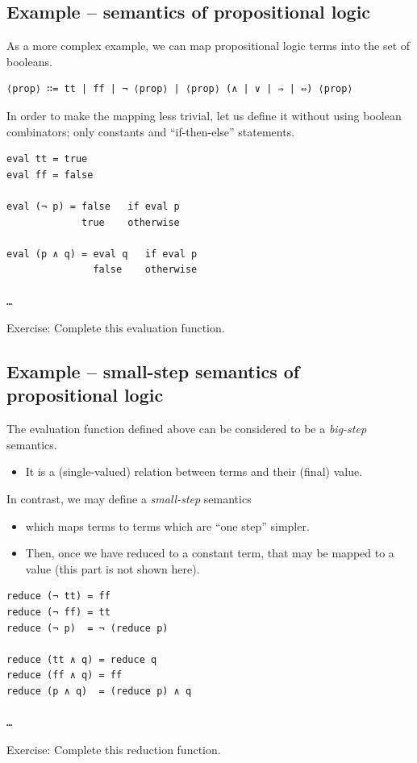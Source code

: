 \documentclass[11pt]{article}
\theoremstyle{definition}
\begin{document}
\subsection{Example – semantics of propositional logic}
\label{sec:orgd3c8abf}
As a more complex example, we can map propositional logic terms
into the set of booleans.
\begin{verbatim}
⟨prop⟩ ∷= tt | ff | ¬ ⟨prop⟩ | ⟨prop⟩ (∧ | ∨ | ⇒ | ⇔) ⟨prop⟩
\end{verbatim}

In order to make the mapping less trivial, let us define it
without using boolean combinators; only constants
and “if-then-else” statements.
\begin{verbatim}
eval tt = true
eval ff = false

eval (¬ p) = false   if eval p
             true    otherwise

eval (p ∧ q) = eval q   if eval p
               false    otherwise

…
\end{verbatim}
Exercise: Complete this evaluation function.

\subsection{Example – small-step semantics of propositional logic}
\label{sec:org61bdf84}
The evaluation function defined above can be considered
to be a \emph{big-step} semantics.
\begin{itemize}
\item It is a (single-valued) relation between terms and
their (final) value.
\end{itemize}

In contrast, we may define a \emph{small-step} semantics
\begin{itemize}
\item which maps terms to terms which are “one step” simpler.
\item Then, once we have reduced to a constant term, that may be mapped
to a value (this part is not shown here).
\end{itemize}
\begin{verbatim}
reduce (¬ tt) = ff
reduce (¬ ff) = tt
reduce (¬ p)  = ¬ (reduce p)

reduce (tt ∧ q) = reduce q
reduce (ff ∧ q) = ff
reduce (p ∧ q)  = (reduce p) ∧ q

…
\end{verbatim}
Exercise: Complete this reduction function.
\end{document}
